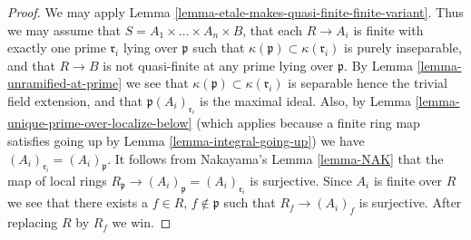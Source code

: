 \begin{proof}
We may apply Lemma \ref{lemma-etale-makes-quasi-finite-finite-variant}.
Thus we may assume that $S = A_1 \times \ldots \times A_n \times B$,
that each $R \to A_i$ is finite with exactly one prime $\mathfrak r_i$
lying over $\mathfrak p$ such that
$\kappa(\mathfrak p) \subset \kappa(\mathfrak r_i)$ is purely inseparable,
and that $R \to B$ is not quasi-finite at any prime lying over $\mathfrak p$.
By Lemma \ref{lemma-unramified-at-prime} we see that
$\kappa(\mathfrak p) \subset \kappa(\mathfrak r_i)$
is separable hence the trivial field extension, and that
$\mathfrak p(A_i)_{\mathfrak r_i}$ is the maximal ideal.
Also, by Lemma \ref{lemma-unique-prime-over-localize-below}
(which applies because a finite ring map satisfies going up by
Lemma \ref{lemma-integral-going-up})
we have $(A_i)_{\mathfrak r_i} = (A_i)_{\mathfrak p}$.
It follows from Nakayama's Lemma \ref{lemma-NAK}
that the map of local rings
$R_{\mathfrak p} \to (A_i)_{\mathfrak p} = (A_i)_{\mathfrak r_i}$
is surjective. Since $A_i$ is finite over $R$ we see that there
exists a $f \in R$, $f \not \in \mathfrak p$ such that
$R_f \to (A_i)_f$ is surjective. After replacing $R$ by $R_f$ we win.
\end{proof}










































